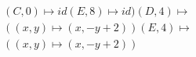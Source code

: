 \documentclass[preview]{standalone}
\begin{document}
\begin{align*}
(C,0) \mapsto id (E,8) \mapsto id) (D,4) \mapsto \\( (x,y) \mapsto (x, -y + 2)) (E,4) \mapsto \\( (x,y) \mapsto (x, -y + 2))
\end{align*}
\end{document}
